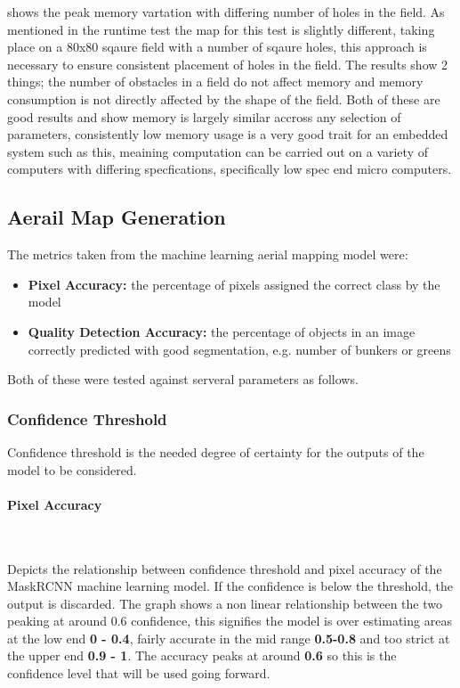 \documentclass[final]{cmpreport_02}
\begin{document}
 shows the peak memory vartation with differing number of holes in the field.
As mentioned in the runtime test the map for this test is slightly different, taking place on a 80x80 sqaure field with a number of sqaure holes, this approach is necessary to ensure consistent placement of holes in the field.
The results show 2 things; the number of obstacles in a field do not affect memory and memory consumption is not directly affected by the shape of the field.
Both of these are good results and show memory is largely similar accross any selection of parameters, consistently low memory usage is a very good trait for an embedded system such as this, meaining computation can be carried out on a variety of computers with differing specfications, specifically low spec end micro computers.

\subsection{Aerail Map Generation}
The metrics taken from the machine learning aerial mapping model were:
\begin{itemize}
    \item{\textbf{Pixel Accuracy:} the percentage of pixels assigned the correct class by the model}
    \item{\textbf{Quality Detection Accuracy:} the percentage of objects in an image correctly predicted with good segmentation, e.g. number of bunkers or greens}
\end{itemize}
Both of these were tested against serveral parameters as follows.

\subsubsection{Confidence Threshold} \label{confidenceThresholdEval}

Confidence threshold is the needed degree of certainty for the outputs of the model to be considered.

\paragraph{Pixel Accuracy} \

 Depicts the relationship between confidence threshold and pixel accuracy of the MaskRCNN machine learning model.
If the confidence is below the threshold, the output is discarded.
The graph shows a non linear relationship between the two peaking at around 0.6 confidence, this signifies the model is over estimating areas at the low end \textbf{0 - 0.4}, fairly accurate in the mid range \textbf{0.5-0.8} and too strict at the upper end \textbf{0.9 - 1}.
The accuracy peaks at around \textbf{0.6} so this is the confidence level that will be used going forward.
\end{document}
